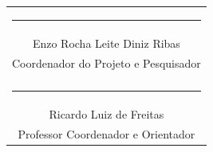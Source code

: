 \documentclass[12pt]{article}
\begin{document}
\vspace{2.5cm}

\begin{center}

\begin{tabular}{c}

\rule{6cm}{0.4pt} \\

Enzo Rocha Leite Diniz Ribas\\

Coordenador do Projeto e
Pesquisador \\

\\[2.5cm]

\rule{6cm}{0.4pt} \\

Ricardo Luiz de Freitas \\

Professor Coordenador e Orientador \\

\end{tabular}

\end{center}

\vspace{2cm}

\hrulefill
\end{document}
